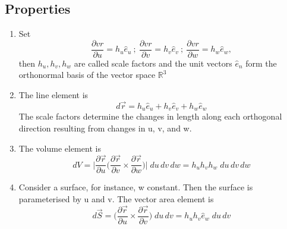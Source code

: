 \documentclass[a4paper, 11pt, normalem]{report}
\newcommand\p{\partial}
\newcommand\vr{\vec{r}}
\newcommand\vs{\vec{S}}
\begin{document}
\subsection{Properties}
\begin{enumerate}
    \item Set
        \begin{equation*}
            \frac{\p vr}{\p u} = h_u \hat{e}_u ~;~ \frac{\p vr}{\p v} = h_v \hat{e}_v ~;~ \frac{\p vr}{\p w} = h_w \hat{e}_w,
        \end{equation*}
        then $h_u, h_v, h_w$ are called scale factors and the unit vectors $\hat{e}_n$ form the orthonormal basis of the vector space $\mathbb{R}^3$
    \item The line element is
        \begin{equation*}
            d\vr = h_u \hat{e}_u + h_v \hat{e}_v + h_w \hat{e}_w
        \end{equation*}
        The scale factors determine the changes in length along each orthogonal direction resulting from changes in u, v, and w.
    \item The volume element is
        \begin{equation*}
            dV = \Bigg|\frac{\p \vr}{\p u}\Big(\frac{\p \vr}{\p v}\times \frac{\p \vr}{\p w}\Big)\Bigg|\;du\,dv\,dw = h_u h_v h_w \; du\,dv\,dw
        \end{equation*}
    \item Consider a surface, for instance, w constant. Then the surface is parameterised by u and v. The vector area element is
        \begin{equation*}
            d\vs = \Big(\frac{\p\vr}{\p u} \times \frac{\p \vr}{\p v}\Big)\; du\, dv = h_u h_v \hat{e}_w \; du\,dv
        \end{equation*}
\end{enumerate}
\end{document}

